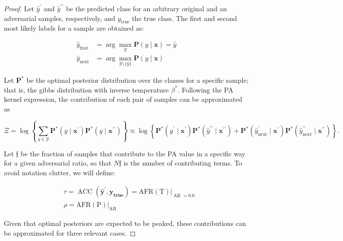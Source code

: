 \begin{proof}
    Let $\hat{y}^\prime$ and $\hat{y}^{\prime \prime}$ be the predicted class for an arbitrary 
    original and an adversarial samples, respectively, and $y_{\text{true}}$ the true class. The first and second
    most likely labels for a sample are obtained as:

    $$
    \begin{aligned}
        \hat{y}_{\text{first}} &= \arg \max_{\mathcal{Y}} \mathbf{P}(y \mid \bm{x}) = \hat{y} \\
        \hat{y}_{\text{next}} &= \arg \max_{\mathcal{Y} \setminus \{ \hat{y} \} } \mathbf{P}(y \mid \bm{x})
    \end{aligned}
    $$

    Let $\mathbf{P}^{*}$ be the optimal posterior distribution over the classes for a
    specific sample; that is, the gibbs distribution with inverse temperature $\beta^{*}$. Following the PA kernel
    expression, the contribution of each pair of samples can be approximated as

    $$
    \Xi = \log \left\{ \sum_{y \in \mathcal{Y}} \mathbf{P}^{*}(y \mid \bm{x}^\prime) \mathbf{P}^{*}(y \mid \bm{x}^{\prime \prime}) \right\}
    \approx \log \left\{ \mathbf{P}^{*}(\hat{y}^\prime \mid \bm{x}^\prime) \mathbf{P}^{*}(\hat{y}^{\prime \prime} \mid \bm{x}^{\prime \prime}) + \mathbf{P}^{*}(\hat{y}_{\text{next}}^\prime \mid \bm{x}^\prime) \mathbf{P}^{*}(\hat{y}_{\text{next}}^{\prime \prime} \mid \bm{x}^{\prime \prime})\right\}.
    $$
    
    Let $\mathfrak{f}$ be the fraction of samples that contribute to the PA value in a specific way for a given
    adversarial ratio, so that $N \mathfrak{f}$ is the number of contributing terms. To avoid notation 
    clutter, we will define:

    $$
    \begin{aligned}
        &\tau = \operatorname{ACC}(\bm{\hat{y}^\prime}, \bm{y_{\text{true}}}) = \operatorname{AFR (T)} \bigg|_{\operatorname{AR} = 0.0} \\
        &\rho = \operatorname{AFR (P)}\bigg|_{\operatorname{AR}}
    \end{aligned}
    $$
    
    Given that optimal posteriors
    are expected to be peaked, these contributions can be approximated for three relevant cases.


\end{proof}
